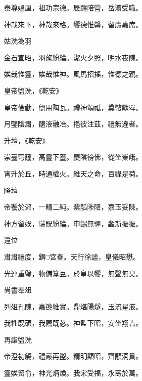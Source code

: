 \begin{pinyinscope}
 泰尊媼厘，祖功宗德。辰躔陪營，岳瀆受職。



 神哉來下，神哉來格。饗德惟馨，留虞嘉席。



 姑洗為羽



 金石宣昭，羽旄紛綸。潔火夕照，明水夜陳。



 娭哉惟靈，娭哉惟神。風馬招搖，惟德之親。



 皇帝盥洗，《乾安》



 皇帝儉勤，盥用陶瓦。禮神頌祗，奠幣獻斝。



 月鑒陰肅，醴液融冶。挹彼注茲，禮無違者。



 升壇，《乾安》



 崇臺穹窿，高靈下墮。慶陰徬佛，從坐嶪峨。



 宵升於丘，時通權火。維天之命，百祿是荷。



 降壇



 帝饗於郊，一精二純。紫觚陟降，嘉玉妥陳。



 神方留娭，瑞貺紛綸。申錫無疆，螽斯振振。



 還位



 肅肅禮度，鋗□宮奏。天行徐謐，皇儀昭懋。



 光連重璧，物備簋豆。於皇以饗，無聲無臭。



 尚書奉俎



 列俎孔陳，嘉籩維實。鼎煁陽燧，玉流星液。



 我牲既碩，我薦既苾。神監下昭，安坐翔吉。



 再詣盥洗



 帝澄初觴，禮嚴再盥。精明顯昭，齊顒洞貫。



 靈娭留俞，神光炳煥。我宋受福，永壽於萬。




\end{pinyinscope}
